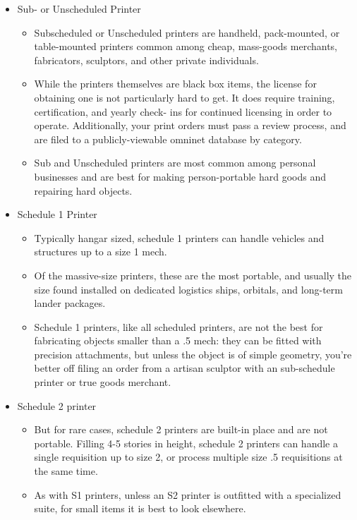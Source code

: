 \begin{itemize}
\item Sub- or Unscheduled Printer
\begin{itemize}
  \item Subscheduled or Unscheduled printers are handheld, pack-mounted, or table-mounted printers
        common among cheap, mass-goods merchants, fabricators, sculptors, and other private individuals.
  \item While the printers themselves are black box items, the license for obtaining one is
        not particularly hard to get. It does require training, certification, and yearly check-
        ins for continued licensing in order to operate. Additionally, your print orders must
        pass a review process, and are filed to a publicly-viewable omninet database by category.
  \item Sub and Unscheduled printers are most common among personal businesses and
        are best for making person-portable hard goods and repairing hard objects.
\end{itemize}
\item Schedule 1 Printer
\begin{itemize}
\item Typically hangar sized, schedule 1 printers can handle vehicles and structures up to a size 1 mech.
\item Of the massive-size printers, these are the most portable, and usually the size found installed
      on dedicated logistics ships, orbitals, and long-term lander packages.
\item Schedule 1 printers, like all scheduled printers, are not the best for fabricating
      objects smaller than a .5 mech: they can be fitted with precision attachments, but
      unless the object is of simple geometry, you’re better off filing an order from a
      artisan sculptor with an sub-schedule printer or true goods merchant.
\end{itemize}
\item Schedule 2 printer
\begin{itemize}
\item But for rare cases, schedule 2 printers are built-in place and are not portable.
      Filling 4-5 stories in height, schedule 2 printers can handle a single requisition up
      to size 2, or process multiple size .5 requisitions at the same time.
\item As with S1 printers, unless an S2 printer is outfitted with a specialized suite, for
      small items it is best to look elsewhere.

\end{itemize}
\end{itemize}
